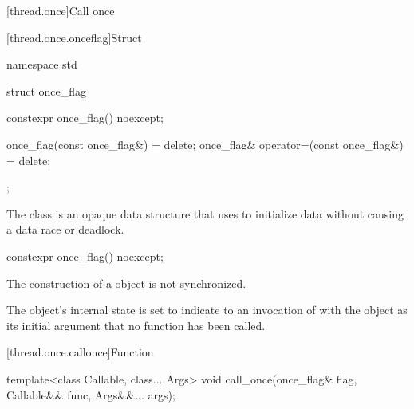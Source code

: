 [thread.once]{Call once}

[thread.once.onceflag]{Struct }

%
\begin{codeblock}
namespace std {
  struct once_flag {
    constexpr once_flag() noexcept;

    once_flag(const once_flag&) = delete;
    once_flag& operator=(const once_flag&) = delete;
  };
}
\end{codeblock}

\pnum
The class  is an opaque data structure that  uses to
initialize data without causing a data race or deadlock.

%
\begin{itemdecl}
constexpr once_flag() noexcept;
\end{itemdecl}

\begin{itemdescr}
\pnum
\sync
The construction of a  object is not synchronized.

\pnum
\ensures
The object's internal state is set to indicate to an invocation of
 with the object as its initial argument that no function has been
called.
\end{itemdescr}

[thread.once.callonce]{Function }

%
\begin{itemdecl}
template<class Callable, class... Args>
  void call_once(once_flag& flag, Callable&& func, Args&&... args);
\end{itemdecl}


